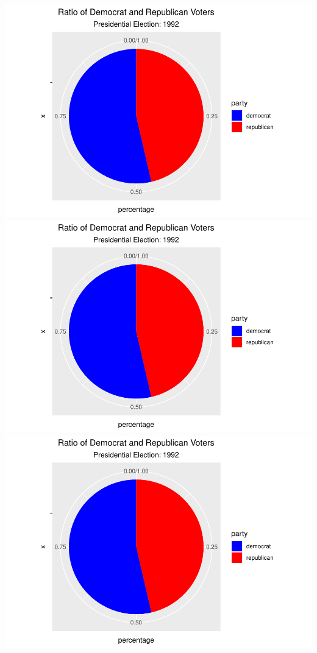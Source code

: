 \documentclass[
]{article}
\begin{document}
\includegraphics{election_files/figure-latex/anim-40.pdf}
\includegraphics{election_files/figure-latex/anim-41.pdf}
\includegraphics{election_files/figure-latex/anim-42.pdf}
\end{document}
